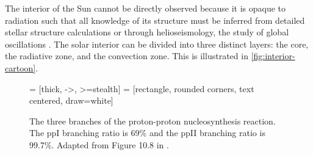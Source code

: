 The interior of the Sun cannot be directly observed because it is opaque to radiation such that all knowledge of its structure must be inferred from detailed stellar structure calculations or through helioseismology, the study of global oscillations \citep{priest_magnetohydrodynamics_2014}. The solar interior can be divided into three distinct layers: the core, the radiative zone, and the convection zone. This is illustrated in \autoref{fig:interior-cartoon}.

\begin{figure}
     = [thick, ->, >=stealth]
     = [rectangle, rounded corners, text centered, draw=white]
    \centering
    \caption{The three branches of the proton-proton nucleosynthesis reaction. The ppI branching ratio is 69\% and the ppII branching ratio is 99.7\%. Adapted from Figure 10.8 in \citet{carroll_introduction_2007}.}
    \label{fig:pp-chain}
\end{figure}

